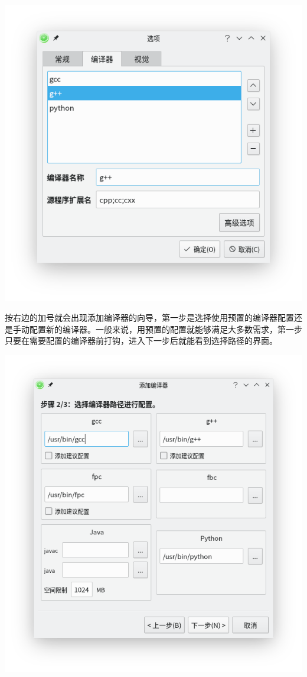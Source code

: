 \documentclass[UTF-8]{ctexart}
\begin{document}
				\begin{center}
					\includegraphics[scale=0.7]{pics/compilersettings.png}
				\end{center}
				
				按右边的加号就会出现添加编译器的向导，第一步是选择使用预置的编译器配置还是手动配置新的编译器。一般来说，用预置的配置就能够满足大多数需求，第一步只要在需要配置的编译器前打钩，进入下一步后就能看到选择路径的界面。
				
				\begin{center}
					\includegraphics[scale=0.7]{pics/addcompiler.png}
				\end{center}
				
\end{document}
